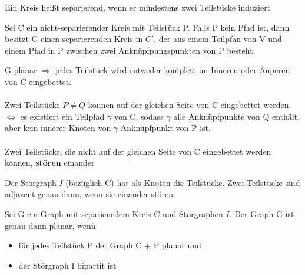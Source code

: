 \documentclass[14pt]{article}
\begin{document}
\begin{definition}
    Ein Kreis heißt separierend, wenn er mindestens zwei
    Teilstücke induziert
\end{definition}
\begin{eigenschaft}
    Sei C ein nicht-separierender Kreis mit Teilstück P.
    Falls P kein Pfad ist, dann besitzt G einen separierenden Kreis
    in $C'$, der aus einem Teilpfan von V und einem Pfad in P 
    zwischen zwei Anknüpfpungspunkten von P besteht.
\end{eigenschaft}
\begin{definition}
    G planar $\Rightarrow$ jedes Teilstück wird entweder komplett im Inneren oder
    Äuperen von C eingebettet. \\
    \\
    Zwei Teilstücke $P \neq Q$ können auf der gleichen Seite von C 
    eingebettet werden $\Leftrightarrow$ es existiert ein Teilpfad $\gamma$ von C,
    sodass $\gamma$ alle Anknüpfpunkte von Q enthält, aber kein innerer 
    Knoten von $\gamma$ Anknüpfpunkt von P ist. \\
    \\
    Zwei Teilstücke, die nicht auf der gleichen Seite von C
    eingebettet werden können, \textbf{stören} einander
\end{definition}
\begin{definition}[Störgraph]
    Der Störgraph $I$ (bezüglich C) hat als Knoten die Teilstücke.
    Zwei Teilstücke sind adjazent genau dann, wenn sie einander stören.
\end{definition}
\begin{eigenschaft}
    Sei G ein Graph mit separienedem Kreis C und Störgraphen $I$.
    Der Graph G ist genau dann planar, wenn
    \begin{itemize}
        \item für jedes Teilstück P der Graph C + P planar und
        \item der Störgraph I bipartit ist
    \end{itemize}
\end{eigenschaft}
\end{document}
